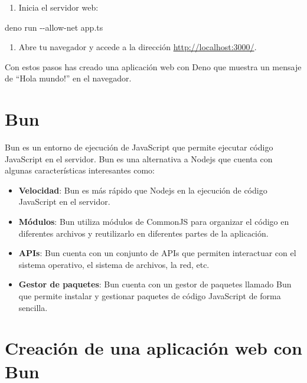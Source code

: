 \documentclass[
  a4paper,
  DIV=11,
  numbers=noendperiod,
  onepage,
  openany]{scrreprt}
\newenvironment{Shaded}{\begin{snugshade}}{\end{snugshade}}
\newcommand{\AttributeTok}[1]{\textcolor[rgb]{0.40,0.45,0.13}{#1}}
\newcommand{\ExtensionTok}[1]{\textcolor[rgb]{0.00,0.23,0.31}{#1}}
\newcommand{\NormalTok}[1]{\textcolor[rgb]{0.00,0.23,0.31}{#1}}
\providecommand{\tightlist}{%
  \setlength{\itemsep}{0pt}\setlength{\parskip}{0pt}}\usepackage{longtable,booktabs,array}
\begin{document}
\begin{enumerate}
\def\labelenumi{\arabic{enumi}.}
\setcounter{enumi}{1}
\tightlist
\item
  Inicia el servidor web:
\end{enumerate}

\begin{Shaded}
\begin{Highlighting}[]
\ExtensionTok{deno}\NormalTok{ run }\AttributeTok{{-}{-}allow{-}net}\NormalTok{ app.ts}
\end{Highlighting}
\end{Shaded}

\begin{enumerate}
\def\labelenumi{\arabic{enumi}.}
\setcounter{enumi}{2}
\tightlist
\item
  Abre tu navegador y accede a la dirección
  \url{http://localhost:3000/}.
\end{enumerate}

Con estos pasos has creado una aplicación web con Deno que muestra un
mensaje de ``Hola mundo!'' en el navegador.

\section{Bun}\label{bun}

Bun es un entorno de ejecución de JavaScript que permite ejecutar código
JavaScript en el servidor. Bun es una alternativa a Nodejs que cuenta
con algunas características interesantes como:

\begin{itemize}
\item
  \textbf{Velocidad}: Bun es más rápido que Nodejs en la ejecución de
  código JavaScript en el servidor.
\item
  \textbf{Módulos}: Bun utiliza módulos de CommonJS para organizar el
  código en diferentes archivos y reutilizarlo en diferentes partes de
  la aplicación.
\item
  \textbf{APIs}: Bun cuenta con un conjunto de APIs que permiten
  interactuar con el sistema operativo, el sistema de archivos, la red,
  etc.
\item
  \textbf{Gestor de paquetes}: Bun cuenta con un gestor de paquetes
  llamado Bun que permite instalar y gestionar paquetes de código
  JavaScript de forma sencilla.
\end{itemize}

\section{Creación de una aplicación web con
Bun}\label{creaciuxf3n-de-una-aplicaciuxf3n-web-con-bun}
\end{document}
